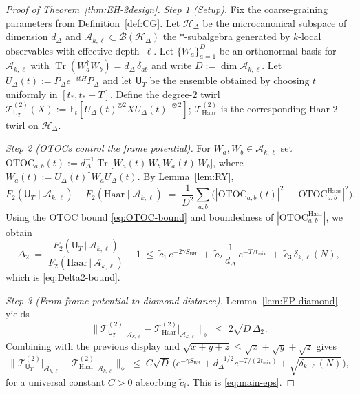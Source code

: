 \documentclass[11pt,a4paper]{article}
\newcommand{\Tr}{\operatorname{Tr}}
\theoremstyle{plain}
\theoremstyle{definition}
\theoremstyle{remark}
\begin{document}
\begin{proof}[Proof of Theorem~\ref{thm:EH-2design}]
\emph{Step 1 (Setup).} Fix the coarse-graining parameters from Definition~\ref{def:CG}. Let $\mathcal{H}_\Delta$
be the microcanonical subspace of dimension $d_\Delta$ and $\mathscr{A}_{k,\ell}\subset\mathcal{B}(\mathcal{H}_\Delta)$ the
$*$-subalgebra generated by $k$-local observables with effective depth~$\ell$. Let $\{W_a\}_{a=1}^{D}$ be an orthonormal basis
for $\mathscr{A}_{k,\ell}$ with $\Tr(W_a^\dagger W_b)=d_\Delta\,\delta_{ab}$ and write $D:=\dim\mathscr{A}_{k,\ell}$.
Let $U_\Delta(t):=P_\Delta e^{-itH}P_\Delta$ and let $\mathsf{U}_T$ be the ensemble obtained by choosing $t$ uniformly
in $[t_\ast,t_\ast+T]$. Define the degree-$2$ twirl
$\mathcal{T}^{(2)}_{\mathsf{U}_T}(X):=\mathbb{E}_{t}\!\left[U_\Delta(t)^{\otimes2} X U_\Delta(t)^{\dagger\otimes2}\right]$;
$\mathcal{T}^{(2)}_{\mathrm{Haar}}$ is the corresponding Haar $2$-twirl on $\mathcal{H}_\Delta$.

\emph{Step 2 (OTOCs control the frame potential).} For $W_a,W_b\in\mathscr{A}_{k,\ell}$ set
$\mathrm{OTOC}_{a,b}(t):=d_\Delta^{-1}\Tr\!\big[W_a(t)\,W_b\,W_a(t)\,W_b\big]$, where $W_a(t):=U_\Delta(t)^\dagger W_a U_\Delta(t)$.
By Lemma~\ref{lem:RY},
\begin{equation*}
  F_2(\mathsf{U}_T \!\mid\! \mathscr{A}_{k,\ell})-F_2(\mathrm{Haar}\!\mid\!\mathscr{A}_{k,\ell})
  \;=\; \frac{1}{D^2}\sum_{a,b}\Big(\overline{|\mathrm{OTOC}_{a,b}(t)|^2}-|\mathrm{OTOC}^{\mathrm{Haar}}_{a,b}|^2\Big).
\end{equation*}
Using the OTOC bound \eqref{eq:OTOC-bound} and boundedness of $|\mathrm{OTOC}^{\mathrm{Haar}}_{a,b}|$, we obtain
\begin{equation*}
 \Delta_2 \;=\; \frac{F_2(\mathsf{U}_T \,|\, \mathscr{A}_{k,\ell})}{F_2(\mathrm{Haar} \,|\, \mathscr{A}_{k,\ell})}-1
 \;\le\; \tilde c_1\, e^{-2\gamma S_{\mathrm{BH}}} \;+\; \tilde c_2\, \frac{1}{d_\Delta}\, e^{-T/t_{\mathrm{mix}}}
 \;+\; \tilde c_3\, \delta_{k,\ell}(N),
\end{equation*}
which is \eqref{eq:Delta2-bound}.

\emph{Step 3 (From frame potential to diamond distance).} Lemma~\ref{lem:FP-diamond} yields
\begin{equation*}
 \Big\| \mathcal{T}^{(2)}_{\mathsf{U}_T}\big|_{\mathscr{A}_{k,\ell}} - \mathcal{T}^{(2)}_{\mathrm{Haar}}\big|_{\mathscr{A}_{k,\ell}} \Big\|_{\diamond}
 \;\le\; 2\sqrt{D\,\Delta_2}.
\end{equation*}
Combining with the previous display and $\sqrt{x+y+z}\le \sqrt{x}+\sqrt{y}+\sqrt{z}$ gives
\begin{equation*}
 \Big\| \mathcal{T}^{(2)}_{\mathsf{U}_T}\big|_{\mathscr{A}_{k,\ell}} - \mathcal{T}^{(2)}_{\mathrm{Haar}}\big|_{\mathscr{A}_{k,\ell}} \Big\|_{\diamond}
 \;\le\; C \sqrt{D}\,\Big( e^{-\gamma S_{\mathrm{BH}}} + d_\Delta^{-1/2} e^{-T/(2t_{\mathrm{mix}})} + \sqrt{\delta_{k,\ell}(N)} \Big),
\end{equation*}
for a universal constant $C>0$ absorbing $\tilde c_i$. This is \eqref{eq:main-eps}.


\end{proof}
\end{document}
